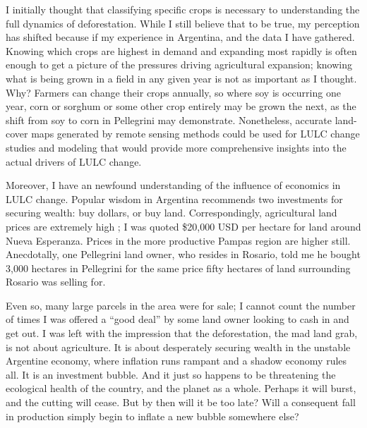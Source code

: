 I initially thought that classifying specific crops is necessary to understanding the full dynamics of deforestation. While I still believe that to be true, my perception has shifted because if my experience in Argentina, and the data I have gathered. Knowing which crops are highest in demand and expanding most rapidly is often enough to get a picture of the pressures driving agricultural expansion; knowing what is being grown in a field in any given year is not as important as I thought. Why? Farmers can change their crops annually, so where soy is occurring one year, corn or sorghum or some other crop entirely may be grown the next, as the shift from soy to corn in Pellegrini may demonstrate. Nonetheless, accurate land-cover maps generated by remote sensing methods could be used for LULC change studies and modeling that would provide more comprehensive insights into the actual drivers of LULC change.

Moreover, I have an newfound understanding of the influence of economics in LULC change. Popular wisdom in Argentina recommends two investments for securing wealth: buy dollars, or buy land. Correspondingly, agricultural land prices are extremely high \autocite{mercopress2010prime}; I was quoted \$20,000 USD per hectare for land around Nueva Esperanza. Prices in the more productive Pampas region are higher still. Anecdotally, one Pellegrini land owner, who resides in Rosario, told me he bought 3,000 hectares in Pellegrini for the same price fifty hectares of land surrounding Rosario was selling for.

Even so, many large parcels in the area were for sale; I cannot count the number of times I was offered a ``good deal'' by some land owner looking to cash in and get out. I was left with the impression that the deforestation, the mad land grab, is not about agriculture. It is about desperately securing wealth in the unstable Argentine economy, where inflation runs rampant and a shadow economy rules all. It is an investment bubble. And it just so happens to be threatening the ecological health of the country, and the planet as a whole. Perhaps it will burst, and the cutting will cease. But by then will it be too late? Will a consequent fall in production simply begin to inflate a new bubble somewhere else?











